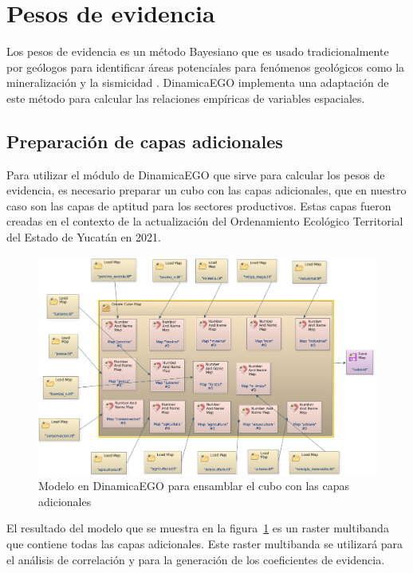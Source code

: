 \documentclass[12pt,a4paper,oldfontcommands]{article}
\begin{document}
\section{Pesos de evidencia}

Los pesos de evidencia es un método Bayesiano que es usado tradicionalmente por geólogos para identificar áreas potenciales para fenómenos geológicos como la mineralización y la sismicidad \cite{agterberg_1992}. DinamicaEGO implementa una adaptación de este método para calcular las relaciones empíricas de variables espaciales.

\subsection{Preparación de capas adicionales}
Para utilizar el módulo de DinamicaEGO que sirve para calcular los pesos de evidencia, es necesario preparar un cubo con las capas adicionales, que en nuestro caso son las capas de aptitud para los sectores productivos. Estas capas fueron creadas en el contexto de la actualización del Ordenamiento Ecológico Territorial del Estado de Yucatán en 2021. 
\bigskip
\begin{figure}[H]
	\centering
	\includegraphics[width=1\textwidth]{./figuras/cubo.png}
	\caption{Modelo en DinamicaEGO para ensamblar el cubo con las capas adicionales}
	\label{fig:cubo}
\end{figure}

El resultado del modelo que se muestra en la figura~\ref{fig:cubo} es un raster multibanda que contiene todas las capas adicionales. Este raster multibanda se utilizará para el análisis de correlación y para la generación de los coeficientes de evidencia. 
 
\end{document}
